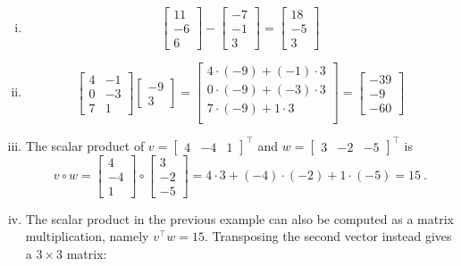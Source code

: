 \begin{example}
\begin{enumerate}[(i)]
	\item \[ \begin{bmatrix}
	11 \\ -6 \\ 6
	\end{bmatrix} - \begin{bmatrix}
	-7 \\ -1 \\ 3
	\end{bmatrix} = \begin{bmatrix}
	18 \\ -5 \\ 3
	\end{bmatrix} \]
	\item \[ \begin{bmatrix}
	4 & -1 \\ 0 & -3 \\ 7 & 1
	\end{bmatrix} \begin{bmatrix}
	-9 \\ 3
	\end{bmatrix} = \begin{bmatrix}
	4 \cdot (-9) + (-1) \cdot 3 \\
	0 \cdot (-9) + (-3) \cdot 3 \\
	7 \cdot (-9) + 1 \cdot 3 \\
	\end{bmatrix} = \begin{bmatrix}
	-39 \\ -9 \\ -60
	\end{bmatrix}\]
	\item The scalar product of $v = \begin{bmatrix} 4 & - 4 & 1 \end{bmatrix}^\top$
	and $w = \begin{bmatrix} 3 & -2 & -5\end{bmatrix}^\top$ is
	\[ v \circ w = \begin{bmatrix} 4 \\ -4 \\ 1 \end{bmatrix} \circ
	\begin{bmatrix} 3 \\ -2 \\ -5\end{bmatrix} 
	= 4 \cdot 3 + (-4) \cdot (-2) + 1 \cdot (-5) = 15 \:. \]
	\item The scalar product in the previous example can also be computed as a matrix multiplication, namely $v^\top w =15$. Transposing the second vector instead gives a $3 \times 3$ matrix:

\end{enumerate}
\end{example}
